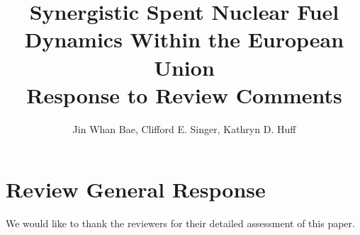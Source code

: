 \documentclass[answers,11pt]{exam}
\begin{document}


%

\title{Synergistic Spent Nuclear Fuel Dynamics Within the European Union\\
        \large Response to Review Comments}
\author{Jin Whan Bae, Clifford E. Singer, Kathryn D. Huff}



%
\maketitle
\section*{Review General Response}
We would like to thank the reviewers for their detailed assessment of
this paper.
\end{document}
